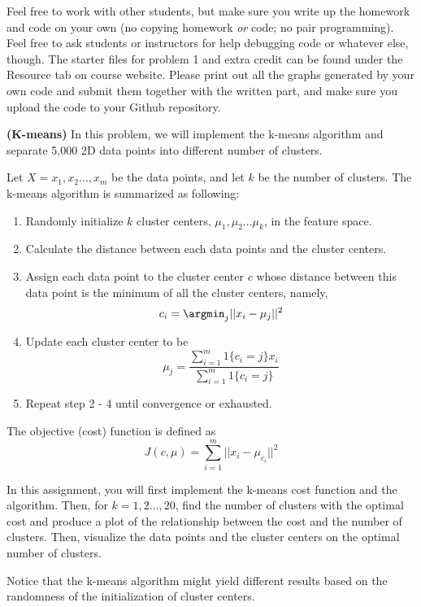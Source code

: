 \documentclass[12pt,letterpaper,fleqn]{hmcpset}
\begin{document}
Feel free to work with other students, but make sure you write up the homework
and code on your own (no copying homework \textit{or} code; no pair programming).
Feel free to ask students or instructors for help debugging code or whatever else,
though.
\newline
\newline
The starter files for problem 1 and extra credit can be found under the Resource tab on course website. Please print out all the graphs generated by your own code and submit them together with the written part, and make sure you upload the code to your Github repository.



\begin{problem}[1]
\textbf{(K-means)} In this problem, we will implement the k-means algorithm and separate 5,000 2D data points into different number of clusters.
\newline
\par Let $X = {x_1, x_2 \ldots, x_m} $ be the data points, and let $k$ be the number of clusters. The k-means algorithm is summarized as following:
\begin{enumerate}[1.]
\item Randomly initialize $k$ cluster centers, $\mu_1, \mu_2 \ldots \mu_k$, in the feature space.
\item Calculate the distance between each data points and the cluster centers.
\item Assign each data point to the cluster center $c$ whose distance between this data point is the minimum of all the cluster centers, namely, \[
c_i = \argmin_j ||x_i - \mu_j||^2
\]
\item Update each cluster center to be\[
\mu_j = \frac{\sum_{i=1}^{m}1\{c_i = j\}x_i}{\sum_{i = 1}^{m}1\{c_i = j\}}
\]
\item Repeat step 2 - 4 until convergence or exhausted.
\end{enumerate}
\par 
The objective (cost) function is defined as \[
J(c, \mu) = \sum_{i = 1}^{m}||x_i - \mu_{c_i}||^2
\]

\par In this assignment, you will first implement the k-means cost function and the algorithm. Then, for $k = 1, 2 \ldots, 20$, find the number of clusters with the optimal cost and produce a plot of the relationship between the cost and the number of clusters. Then, visualize the data points and the cluster centers on the optimal number of clusters.
\newline 
\par Notice that the k-means algorithm might yield different results based on the randomness of the initialization of cluster centers.
\end{problem}
\begin{solution}
\vfill
\end{solution}
\newpage
\end{document}
